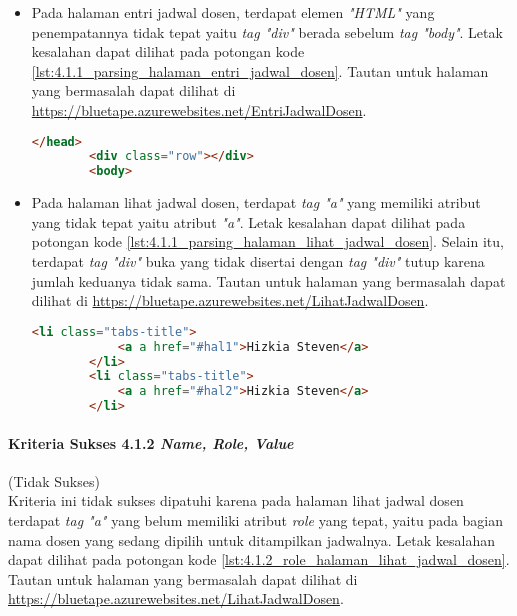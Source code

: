 \begin{itemize}
    \item Pada halaman entri jadwal dosen, terdapat elemen \textit{"HTML"} yang penempatannya tidak tepat yaitu \textit{tag "div"} berada sebelum \textit{tag "body"}. Letak kesalahan dapat dilihat pada potongan kode \ref{lst:4.1.1_parsing_halaman_entri_jadwal_dosen}. Tautan untuk halaman yang bermasalah dapat dilihat di \url{https://bluetape.azurewebsites.net/EntriJadwalDosen}.
    \begin{lstlisting}[frame=single, label={lst:4.1.1_parsing_halaman_entri_jadwal_dosen}, language=HTML, caption=Kriteria Sukses 4.1.1 - Kesalahan Elemen pada Halaman Entri Jadwal Dosen]
        </head>
        <div class="row"></div>        
        <body>
    \end{lstlisting}
    
    \item Pada halaman lihat jadwal dosen, terdapat \textit{tag "a"} yang memiliki atribut yang tidak tepat yaitu atribut \textit{"a"}. Letak kesalahan dapat dilihat pada potongan kode \ref{lst:4.1.1_parsing_halaman_lihat_jadwal_dosen}. Selain itu, terdapat \textit{tag "div"} buka yang tidak disertai dengan \textit{tag "div"} tutup karena jumlah keduanya tidak sama. Tautan untuk halaman yang bermasalah dapat dilihat di \url{https://bluetape.azurewebsites.net/LihatJadwalDosen}.
    \begin{lstlisting}[frame=single, label={lst:4.1.1_parsing_halaman_lihat_jadwal_dosen}, language=HTML, caption=Kriteria Sukses 4.1.1 - Kesalahan Elemen pada Halaman Lihat Jadwal Dosen]
        <li class="tabs-title">
            <a a href="#hal1">Hizkia Steven</a>
        </li>
        <li class="tabs-title">
            <a a href="#hal2">Hizkia Steven</a>
        </li>
    \end{lstlisting}
\end{itemize}

\paragraph{Kriteria Sukses 4.1.2 \textit{Name, Role, Value}}
\label{par:kepatuhan_bluetape_kriteria_sukses_4.1.2}
(Tidak Sukses)\\

Kriteria ini tidak sukses dipatuhi karena pada halaman lihat jadwal dosen terdapat \textit{tag "a"} yang belum memiliki atribut \textit{role} yang tepat, yaitu pada bagian nama dosen yang sedang dipilih untuk ditampilkan jadwalnya. Letak kesalahan dapat dilihat pada potongan kode \ref{lst:4.1.2_role_halaman_lihat_jadwal_dosen}. Tautan untuk halaman yang bermasalah dapat dilihat di \url{https://bluetape.azurewebsites.net/LihatJadwalDosen}.

